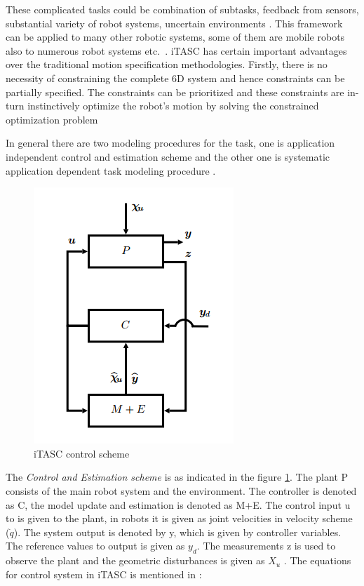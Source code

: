 These complicated tasks could be combination of subtasks, feedback from sensors, substantial variety of robot systems, uncertain environments \cite{itasc}. 
This framework can be applied to many other robotic systems, some of them are mobile robots also to numerous robot systems etc.\ \cite{smits2008itasc}. 
iTASC has certain important advantages over the traditional motion specification methodologies. Firstly, there is no necessity of constraining the complete 6D system and hence constraints can be partially specified. The constraints can be prioritized and these constraints are in-turn instinctively optimize the robot's motion by solving the constrained optimization problem \cite{itascwiki}


In general there are two modeling procedures for the task, one is application independent control and estimation scheme and the other one is 
systematic application dependent task modeling procedure \cite{itasc}.
\begin{figure}
	\centering
	\includegraphics[scale=0.6]{images/iTASC}
	\caption{iTASC control scheme \cite{smits2008itasc}}
	\label{iTASC}
\end{figure}
The \textit{Control and Estimation scheme} is as indicated in the figure \ref{iTASC}. The plant P consists of the main robot system and the environment. The controller is denoted as C, the model update and estimation is denoted as M+E. The control input u to is given to the plant, in robots it is given as joint velocities in velocity scheme ($\dot{q}$). The system output is denoted by y, which is given by controller variables. The reference values to output is given as $y_{d}$. The measurements z is used to observe the plant and the geometric disturbances is given as $X_{u}$ \cite{itasc}\cite{smits2008itasc}. The equations for control system in iTASC is mentioned in \cite{decre2009extending}:


